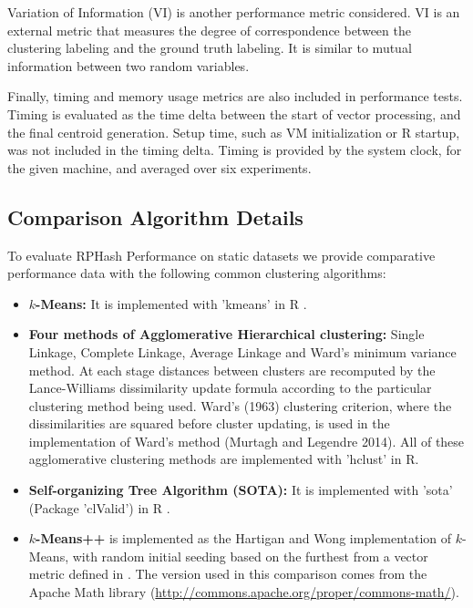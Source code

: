 Variation of Information (VI) is another performance metric considered.  VI is an external metric
that measures the degree of correspondence between the clustering labeling and the ground truth
labeling.  It is similar to mutual information between two random variables.

Finally, timing and memory usage metrics are also included in performance tests.  Timing is
evaluated as the time delta between the start of vector processing, and the final centroid
generation.  Setup time, such as VM initialization or R startup, was not included in the timing
delta.  Timing is provided by the system clock, for the given machine, and averaged over six
experiments.

\subsection{Comparison Algorithm Details}

To evaluate \textsf{RPHash} Performance on static datasets we provide comparative performance data with the
following common clustering algorithms:
\begin{itemize}
 \item \textbf{$k$-Means:} It is implemented with 'kmeans' in R \cite{Hartigan}.\label{clusteralgos} 
 \item \textbf{Four methods of Agglomerative Hierarchical clustering:} Single Linkage, Complete
   Linkage, Average Linkage and Ward's minimum variance method.  At each stage distances between
   clusters are recomputed by the Lance-Williams dissimilarity update formula according to the
   particular clustering method being used.  Ward's (1963) clustering criterion, where the
   dissimilarities are squared before cluster updating, is used in the implementation of Ward's
   method (Murtagh and Legendre 2014).  All of these agglomerative clustering methods are implemented
   with 'hclust' in R.
\item \textbf{Self-organizing Tree Algorithm (SOTA):} It is implemented with 'sota' (Package
  'clValid') in R \cite{Herrero}.
\item \textbf{$k$-Means++} is implemented as the Hartigan and Wong \cite{Hartigan} implementation of
  $k$-Means, with random initial seeding based on the furthest from a vector metric defined in
  \cite{arthur-07}.  The version used in this comparison comes from the Apache Math library
  (\url{http://commons.apache.org/proper/commons-math/}).
\end{itemize}

